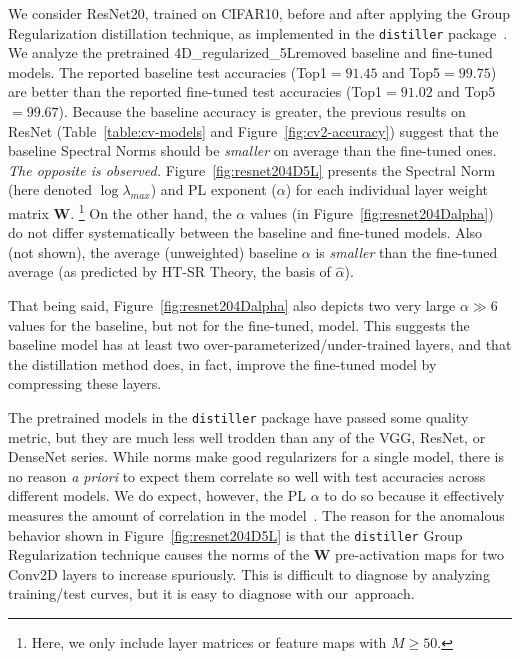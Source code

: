 We consider ResNet20, trained on CIFAR10, before and after applying the Group Regularization distillation technique, as implemented in the \texttt{distiller} package~\cite{distiller}.
We analyze the pretrained 4D\_regularized\_5Lremoved baseline and fine-tuned models. 
The reported baseline test accuracies (Top1$=91.45$ and Top5$=99.75$) are better than the reported fine-tuned test accuracies (Top1$=91.02$ and Top5$=99.67$).  Because the baseline accuracy is greater,  the previous results on ResNet (Table~\ref{table:cv-models} and Figure~\ref{fig:cv2-accuracy}) suggest that the baseline Spectral Norms should be \emph{smaller} on average than the fine-tuned ones. \emph{The opposite is observed.}
Figure~\ref{fig:resnet204D5L} presents the Spectral Norm (here denoted $\log\lambda_{max}$) and PL exponent ($\alpha$) for each individual layer weight matrix $\mathbf{W}$.%
\footnote{Here, we only include layer matrices or feature maps with $M\ge50$.}
On the other hand, the $\alpha$ values (in Figure~\ref{fig:resnet204Dalpha}) do not differ systematically between the baseline and fine-tuned models.
Also (not shown), the average (unweighted) baseline $\alpha$ is \emph{smaller} than the fine-tuned average (as predicted by HT-SR Theory, the basis of $\hat{\alpha}$).

That being said, Figure~\ref{fig:resnet204Dalpha} also depicts two very large $\alpha\gg 6$ values for the baseline, but not for the fine-tuned, model.
This suggests the baseline model has at least two over-parameterized/under-trained layers, and that the distillation method does, in fact, improve the fine-tuned model by compressing these layers.

The pretrained models in the \texttt{distiller} package have passed some quality metric, but they are much less well trodden than any of the 
VGG, ResNet, or DenseNet series.  %
While norms make good regularizers for a single model, there is no reason \emph{a priori} to expect them correlate so well with test accuracies across different models.
We do expect, however, the PL $\alpha$ to do so because it effectively measures the amount of correlation in the model~\cite{MM18_TR, MM19_HTSR_ICML, MM20_SDM}.
The reason for the anomalous behavior shown in 
Figure~\ref{fig:resnet204D5L}
is that the \texttt{distiller} Group Regularization technique 
causes the norms of the $\mathbf{W}$ pre-activation maps for two Conv2D layers to increase spuriously.
This is difficult to diagnose by analyzing training/test curves, but it is easy to diagnose with our~approach.


